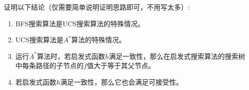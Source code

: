     \begin{problem}
        证明以下结论（仅需要简单说明证明思路即可，不用写太多）:
        \begin{enumerate}
            \item BFS搜索算法是UCS搜索算法的特殊情况。
            \item UCS搜索算法是$A^{\ast}$算法的特殊情况。
            \item 运行$A^{\ast}$算法时，若启发式函数$h$满足一致性，那么在启发式搜索算法的搜索树中每条路径的子节点的$f$值大于等于其父节点。
            \item 若启发式函数$h$满足一致性，那么它也会满足可接受性。
        \end{enumerate}
    \end{problem}
